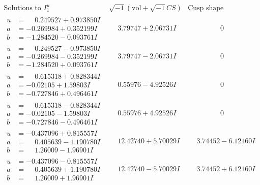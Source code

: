 \documentclass[1p]{elsarticle_modified}
\theoremstyle{definition}
\newcommand{\I}{\sqrt{-1}}
\begin{document}
$$\begin{array}{c|c|c}  
\text{Solutions to }I^u_{1}& \I (\text{vol} + \sqrt{-1}CS) & \text{Cusp shape}\\
 \hline 
\begin{aligned}
u &= \phantom{-}0.249527 + 0.973850 I \\
a &= -0.269984 + 0.352199 I \\
b &= -1.284520 - 0.093761 I\end{aligned}
 & \phantom{-}3.79747 + 2.06731 I & \phantom{-0.000000 } 0 \\ \hline\begin{aligned}
u &= \phantom{-}0.249527 - 0.973850 I \\
a &= -0.269984 - 0.352199 I \\
b &= -1.284520 + 0.093761 I\end{aligned}
 & \phantom{-}3.79747 - 2.06731 I & \phantom{-0.000000 } 0 \\ \hline\begin{aligned}
u &= \phantom{-}0.615318 + 0.828344 I \\
a &= -0.02105 + 1.59803 I \\
b &= -0.727846 + 0.496461 I\end{aligned}
 & \phantom{-}0.55976 - 4.92526 I & \phantom{-0.000000 } 0 \\ \hline\begin{aligned}
u &= \phantom{-}0.615318 - 0.828344 I \\
a &= -0.02105 - 1.59803 I \\
b &= -0.727846 - 0.496461 I\end{aligned}
 & \phantom{-}0.55976 + 4.92526 I & \phantom{-0.000000 } 0 \\ \hline\begin{aligned}
u &= -0.437096 + 0.815557 I \\
a &= \phantom{-}0.405639 - 1.190780 I \\
b &= \phantom{-}1.26009 - 1.96901 I\end{aligned}
 & \phantom{-}12.42740 + 5.70029 I & \phantom{-}3.74452 - 6.12160 I \\ \hline\begin{aligned}
u &= -0.437096 - 0.815557 I \\
a &= \phantom{-}0.405639 + 1.190780 I \\
b &= \phantom{-}1.26009 + 1.96901 I\end{aligned}
 & \phantom{-}12.42740 - 5.70029 I & \phantom{-}3.74452 + 6.12160 I \\ \hline\begin{aligned}

\end{aligned}
\end{array}$$
\end{document}
